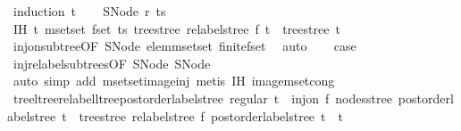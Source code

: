 \begin{isabellebody}
%
\isadelimproof
%
\endisadelimproof
%
\isatagproof
{}\isamarkupfalse%
\ {\isacharparenleft}{\kern0pt}induction\ t{\isacharparenright}{\kern0pt}\isanewline
\ \ \isamarkupfalse%
\ {\isacharparenleft}{\kern0pt}SNode\ r\ ts{\isacharparenright}{\kern0pt}\isanewline
\ \ \isamarkupfalse%
\ \isamarkupfalse%
\ IH{\isacharcolon}{\kern0pt}\ {\isachardoublequoteopen}{\isasymforall}t{\isasymin}{\isacharhash}{\kern0pt}\ mset{\isacharunderscore}{\kern0pt}set\ {\isacharparenleft}{\kern0pt}fset\ ts{\isacharparenright}{\kern0pt}{\isachardot}{\kern0pt}\ tree{\isacharunderscore}{\kern0pt}stree\ {\isacharparenleft}{\kern0pt}relabel{\isacharunderscore}{\kern0pt}stree\ f\ t{\isacharparenright}{\kern0pt}\ {\isacharequal}{\kern0pt}\ tree{\isacharunderscore}{\kern0pt}stree\ t{\isachardoublequoteclose}\isanewline
\ \ \ \ \isamarkupfalse%
\ inj{\isacharunderscore}{\kern0pt}on{\isacharunderscore}{\kern0pt}subtree{\isacharbrackleft}{\kern0pt}OF\ SNode{\isacharparenleft}{\kern0pt}{}{\isacharparenright}{\kern0pt}{\isacharbrackright}{\kern0pt}\ elem{\isacharunderscore}{\kern0pt}mset{\isacharunderscore}{\kern0pt}set\ finite{\isacharunderscore}{\kern0pt}fset\ \isamarkupfalse%
\ auto\isanewline
\ \ \isamarkupfalse%
\ {\isacharquery}{\kern0pt}case\ \isamarkupfalse%
\ inj{\isacharunderscore}{\kern0pt}relabel{\isacharunderscore}{\kern0pt}subtrees{\isacharbrackleft}{\kern0pt}OF\ SNode{\isacharparenleft}{\kern0pt}{}{\isacharparenright}{\kern0pt}\ SNode{\isacharparenleft}{\kern0pt}{}{\isacharparenright}{\kern0pt}{\isacharbrackright}{\kern0pt}\isanewline
\ \ \ \ \isamarkupfalse%
\ {\isacharparenleft}{\kern0pt}auto\ simp\ add{\isacharcolon}{\kern0pt}\ mset{\isacharunderscore}{\kern0pt}set{\isacharunderscore}{\kern0pt}image{\isacharunderscore}{\kern0pt}inj{\isacharcomma}{\kern0pt}\ metis\ IH\ image{\isacharunderscore}{\kern0pt}mset{\isacharunderscore}{\kern0pt}cong{\isacharparenright}{\kern0pt}\isanewline
{}\isamarkupfalse%
%
\endisatagproof
{\isafoldproof}%
%
\isadelimproof
\isanewline
%
\endisadelimproof
\isanewline
{}\isamarkupfalse%
\ tree{\isacharunderscore}{\kern0pt}ltree{\isacharunderscore}{\kern0pt}relabel{\isacharunderscore}{\kern0pt}ltree{\isacharunderscore}{\kern0pt}postorder{\isacharunderscore}{\kern0pt}label{\isacharunderscore}{\kern0pt}stree{\isacharcolon}{\kern0pt}\ {\isachardoublequoteopen}regular\ t\ {\isasymLongrightarrow}\ inj{\isacharunderscore}{\kern0pt}on\ f\ {\isacharparenleft}{\kern0pt}nodes{\isacharunderscore}{\kern0pt}stree\ {\isacharparenleft}{\kern0pt}postorder{\isacharunderscore}{\kern0pt}label{\isacharunderscore}{\kern0pt}stree\ t{\isacharparenright}{\kern0pt}{\isacharparenright}{\kern0pt}\ {\isasymLongrightarrow}\ tree{\isacharunderscore}{\kern0pt}stree\ {\isacharparenleft}{\kern0pt}relabel{\isacharunderscore}{\kern0pt}stree\ f\ {\isacharparenleft}{\kern0pt}postorder{\isacharunderscore}{\kern0pt}label{\isacharunderscore}{\kern0pt}stree\ t{\isacharparenright}{\kern0pt}{\isacharparenright}{\kern0pt}\ {\isacharequal}{\kern0pt}\ t{\isachardoublequoteclose}\isanewline

\end{isabellebody}
